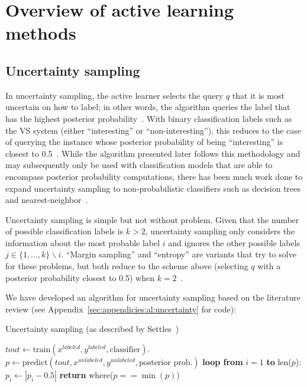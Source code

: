 \section{Overview of active learning methods}
\label{sec:al:methods}

\subsection{Uncertainty sampling}
\label{sec:al:methods:uncertainty} 

In uncertainty sampling, the active learner selects the query $q$ that it is 
most uncertain on how to label; in other words, the algorithm queries the label 
that has the highest posterior probability~\cite{lewis1994}. With binary 
classification labels such as the VS system (either ``interesting'' or 
``non-interesting''), this reduces to the case of querying the instance whose 
posterior probability of being ``interesting'' is closest to 
0.5~\cite{lewis1994}. While the algorithm presented later follows this 
methodology and may subsequently only be used with classification models that 
are able to encompass posterior probability computations, there has been much 
work done to expand uncertainty sampling to non-probabilistic classifiers such 
as decision trees and nearest-neighbor~\cite{settles2010}.

Uncertainty sampling is simple but not without problem. Given that the 
number of possible classification labels is $k > 2$, uncertainty sampling only 
considers the information about the most probable label $i$ and ignores the 
other possible labels $j \in \{1,...,k\}\backslash i$. ``Margin sampling'' and 
``entropy'' are variants that try to solve for these problems, but 
both reduce to the scheme above (selecting $q$ with a posterior probability 
closest to 0.5) when $k=2$~\cite{settles2010}.

We have developed an algorithm for uncertainty sampling based on the literature 
review (see Appendix~\ref{sec:appendicies:al:uncertainty} for code):

\tablespacing
\begin{algorithm}[H]
	\caption{Uncertainty sampling (as described by 
	Settles~\cite{settles2010})}\label{euclid}
	\begin{algorithmic}[1]
		\State $\textit{tout} \gets 
		\text{train}(x^{labeled},y^{labeled},\text{classifier})$.
		\State $p \gets 
		\text{predict}(\textit{tout},x^{unlabeled},y^{unlabeled},
		\text{posterior prob.})$
		\State \textbf{loop from} $i=1$ \textbf{to} len($p$):
		\State \indent $p_i \gets |p_i-0.5|$
		\State \textbf{return} where($p==\min{(p)}$)
		\EndProcedure
	\end{algorithmic}
\end{algorithm}
\bodyspacing

